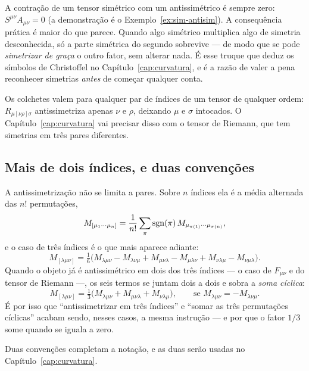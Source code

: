 \documentclass[12pt,a4paper,oneside]{book}
\theoremstyle{rgplain}
\theoremstyle{rgremark}
\begin{document}
\begin{resultado}
A contração de um tensor simétrico com um antissimétrico é sempre zero:
$S^{\mu\nu}A_{\mu\nu}=0$ (a demonstração é o Exemplo~\ref{ex:sim-antisim}).
A consequência prática é maior do que parece. Quando algo simétrico multiplica
algo de simetria desconhecida, só a parte simétrica do segundo sobrevive --- de
modo que se pode \emph{simetrizar de graça} o outro fator, sem alterar nada. É
esse truque que deduz os símbolos de Christoffel no
Capítulo~\ref{cap:curvatura}, e é a razão de valer a pena reconhecer simetrias
\emph{antes} de começar qualquer conta.
\end{resultado}

Os colchetes valem para qualquer par de índices de um tensor de qualquer ordem:
$R_{\mu[\nu\rho]\sigma}$ antissimetriza apenas $\nu$ e $\rho$, deixando $\mu$ e
$\sigma$ intocados. O Capítulo~\ref{cap:curvatura} vai precisar disso com o
tensor de Riemann, que tem simetrias em três pares diferentes.

\subsection*{Mais de dois índices, e duas convenções}

A antissimetrização não se limita a pares. Sobre $n$ índices ela é a média
alternada das $n!$ permutações,
\begin{equation}
  M_{[\mu_1\cdots\mu_n]}
  =\frac{1}{n!}\sum_{\pi}\operatorname{sgn}(\pi)\,
   M_{\mu_{\pi(1)}\cdots\mu_{\pi(n)}} ,
  \label{eq:antisim-n}
\end{equation}
e o caso de três índices é o que mais aparece adiante:
\[
  M_{[\lambda\mu\nu]}=\tfrac16\bigl(
    M_{\lambda\mu\nu}-M_{\lambda\nu\mu}
   +M_{\mu\nu\lambda}-M_{\mu\lambda\nu}
   +M_{\nu\lambda\mu}-M_{\nu\mu\lambda}\bigr).
\]
Quando o objeto já é antissimétrico em dois dos três índices --- o caso de
$F_{\mu\nu}$ e do tensor de Riemann ---, os seis termos se juntam dois a dois e
sobra a \emph{soma cíclica}:
\begin{equation}
  M_{[\lambda\mu\nu]}
  =\tfrac13\bigl(M_{\lambda\mu\nu}+M_{\mu\nu\lambda}+M_{\nu\lambda\mu}\bigr),
  \qquad\text{se }M_{\lambda\mu\nu}=-M_{\lambda\nu\mu} .
  \label{eq:antisim-ciclica}
\end{equation}
É por isso que ``antissimetrizar em três índices'' e ``somar as três
permutações cíclicas'' acabam sendo, nesses casos, a mesma instrução --- e por
que o fator $1/3$ some quando se iguala a zero.

Duas convenções completam a notação, e as duas serão usadas no
Capítulo~\ref{cap:curvatura}.
\end{document}

